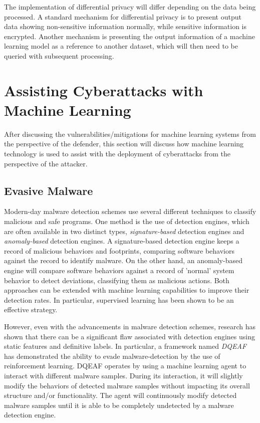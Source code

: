 \documentclass[11pt,conference]{IEEEtran}
\begin{document}
The implementation of differential privacy will differ depending on the data
being processed. A standard mechanism for differential privacy is to present
output data showing non-sensitive information normally, while sensitive
information is encrypted. Another mechanism is presenting the output
information of a machine learning model as a reference to another dataset, which
will then need to be queried with subsequent processing.

\section{Assisting Cyberattacks with Machine Learning}
After discussing the vulnerabilities/mitigations for machine learning systems
from the perspective of the defender, this section will discuss how machine
learning technology is used to assist with the deployment of cyberattacks from
the perspective of the attacker.

\subsection{Evasive Malware}
Modern-day malware detection schemes use several different techniques to
classify malicious and safe programs. One method is the use of detection
engines, which are often available in two distinct types,
\emph{signature-based} detection engines and \emph{anomaly-based} detection
engines. A signature-based detection engine keeps a record of malicious
behaviors and footprints, comparing software behaviors against the record to
identify malware. On the other hand, an anomaly-based engine will
compare software behaviors against a record of 'normal' system behavior to
detect deviations, classifying them as malicious actions. Both approaches can be extended with machine learning
capabilities to improve their detection rates. In particular, supervised
learning has been shown to be an effective strategy.

However, even with the advancements in malware detection schemes, research
has shown that there can be a significant flaw associated with detection
engines using static features and definitive labels. In particular, a framework
named \emph{DQEAF} has demonstrated the ability to evade malware-detection by
the use of reinforcement learning. DQEAF operates by using a machine
learning agent to interact with different malware samples. During its
interaction, it will slightly modify the behaviors of detected malware samples
without impacting its overall structure and/or functionality. The agent will
continuously modify detected malware samples until it is able to be completely
undetected by a malware detection engine.
\end{document}
